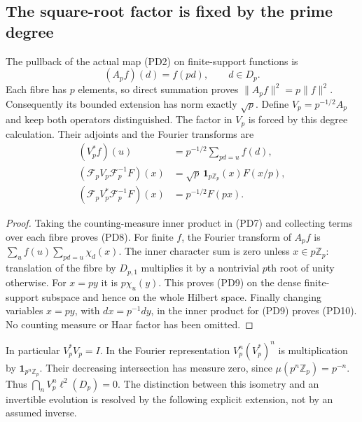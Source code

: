 \documentclass[11pt,a4paper]{article}
\theoremstyle{definition}\newtheorem{definition}[theorem]{Definition}
\newcommand{\Z}{\mathbb Z}\newcommand{\Q}{\mathbb Q}
\begin{document}
\subsection{The square-root factor is fixed by the prime degree}
The pullback of the actual map (PD2) on finite-support functions is
\[
 (A_pf)(d)=f(pd),\qquad d\in D_p.
 \tag{PD7}
\]
Each fibre has $p$ elements, so direct summation proves
$\|A_pf\|^2=p\|f\|^2$. Consequently its bounded extension has
norm exactly $\sqrt p$. Define
$V_p=p^{-1/2}A_p$ and keep both operators distinguished. The factor
in $V_p$ is forced by this degree calculation.
Their adjoints and the Fourier transforms are
\begin{align}
 (V_p^*f)(u)&=p^{-1/2}\sum_{pd=u}f(d),\tag{PD8}\\
 (\mathcal F_pV_p\mathcal F_p^{-1}F)(x)
 &=\sqrt p\,\mathbf1_{p\Z_p}(x)F(x/p),\tag{PD9}\\
 (\mathcal F_pV_p^*\mathcal F_p^{-1}F)(x)
 &=p^{-1/2}F(px).\tag{PD10}
\end{align}
\begin{proof}
Taking the counting-measure inner product in (PD7) and collecting terms
over each fibre proves (PD8). For finite $f$, the Fourier transform of
$A_pf$ is
$\sum_u f(u)\sum_{pd=u}\chi_d(x)$. The inner character sum is zero
unless $x\in p\Z_p$: translation of the fibre by $D_{p,1}$ multiplies
it by a nontrivial $p$th root of unity otherwise. For $x=py$ it is
$p\chi_u(y)$. This proves (PD9) on the dense finite-support subspace
and hence on the whole Hilbert space. Finally changing variables
$x=py$, with $dx=p^{-1}dy$, in the inner product for (PD9) proves
(PD10). No counting measure or Haar factor has been omitted.
\end{proof}

In particular $V_p^*V_p=I$. In the Fourier representation
$V_p^n(V_p^*)^n$ is multiplication by $\mathbf1_{p^n\Z_p}$.
Their decreasing intersection has measure zero, since
$\mu(p^n\Z_p)=p^{-n}$. Thus $\bigcap_nV_p^n\ell^2(D_p)=0$.
The distinction between this isometry and an invertible evolution is
resolved by the following explicit extension, not by an assumed inverse.
\end{document}

